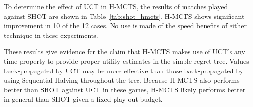 \documentclass{kecsmstr}
\begin{document}
\begin{table}[t]
\centering
\captionsetup{justification=centering,margin=1cm}
\tabcolsep=0.3cm
\vspace{3mm}
{\caption[H-MCTS vs. SHOT.]{H-MCTS vs. SHOT, random play-outs\\ Win percentages with respect to H-MCTS. 1,000 games} \label{tab:shot_hmcts}}
\end{table}

To determine the effect of UCT in H-MCTS, the results of matches played against SHOT are shown in Table~\ref{tab:shot_hmcts}. H-MCTS shows significant improvement in 10 of the 12 cases. No use is made of the speed benefits of either technique in these experiments. 

These results give evidence for the claim that H-MCTS makes use of UCT's any time property to provide proper utility estimates in the simple regret tree. Values back-propagated by UCT may be more effective than those back-propagated by using Sequential Halving throughout the tree. Because H-MCTS also performs better than SHOT against UCT in these games, H-MCTS likely performs better in general than SHOT given a fixed play-out budget.
\newpage
\end{document}

